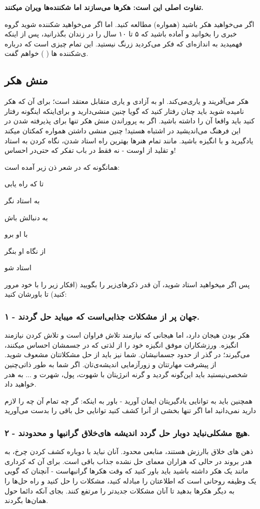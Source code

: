 \textbf{تفاوت اصلی این است: هکرها می‌سازند اما شکننده‌ها ویران میکنند.}

اگر می‌خواهید هکر باشید (همواره) مطالعه کنید. اما اگر می‌خواهید شکننده شوید گروه خبری‌
\href{news://alt.2600/}{}
را بخوانید و آماده باشید که ۵ تا ۱۰ سال را در زندان بگذرانید، پس از اینکه فهمیدید به اندازه‌ای که فکر می‌کردید زرنگ نیستید. این تمام چیزی است که درباره ی‌شکننده ها (
) خواهم گفت.
\subsection*{منش هکر}
هکر می‌آفریند و یاری‌می‌کند. او به آزادی و یاری متقابل معتقد است؛ برای آن که هکر نامیده شوید باید چنان رفتار کنید که گویا چنین منشی‌دارید و برای‌اینکه اینگونه رفتار کنید باید واقعا آن را داشته باشید. اگر به پروراندن منش هکر تنها برای پذیرفته شدن در این فرهنگ می‌اندیشید در اشتباه هستید! چنین منشی داشتن همواره کمکتان میکند یادگیرید و با انگیزه باشید. مانند تمام هنرها بهترین راه استاد شدن، نگاه کردن به استاد و تقلید از اوست - نه فقط در باب تفکر که حتی‌در احساس!

همانگونه که در شعر ذن زیر آمده است:
\begin{mybox}
تا که راه یابی

به استاد نگر

به دنبالش باش

با او برو

از نگاه او بنگر

استاد شو
\end{mybox}
پس اگر میخواهید استاد شوید، آن قدر ذکرهای‌زیر را بگویید (افکار زیر را با خود مرور کنید) تا باورشان کنید:
\subsubsection*{۱ - جهان پر از مشکلات جذابی‌است که میباید حل گردند.}
هکر بودن هیجان دارد، اما هیجانی که نیازمند تلاش فراوان است و تلاش کردن نیازمند انگیزه. ورزشکاران موفق انگیزه خود را از لذتی که در جسمشان احساس میکنند، می‌گیرند؛ در گذر از حدود جسمانیشان. شما نیز باید از حل مشکلاتتان مشعوف شوید. از پیشرفت مهارتتان و زورآزمایی اندیشه‌ی‌تان.
اگر شما به طور ذاتی‌چنین شخصی‌نیستید باید این‌گونه گردید و گرنه انرژیتان با شهوت، پول، شهرت و ... به هدر خواهید داد.

همچنین باید به توانایی یادگیریتان ایمان آورید - باور به اینکه: گر چه تمام آن چه را لازم دارید نمی‌دانید اما اگر تنها بخشی از آنرا کشف کنید توانایی حل باقی را بدست می‌آورید
\subsubsection*{۲ - هیچ مشکلی‌نباید دوبار حل گردد اندیشه های‌خلاق گرانبها و محدودند.}
ذهن های خلاق باارزش هستند، منابعی محدود. آنان نباید با دوباره کشف کردن چرخ، به هدر بروند در حالی که هزاران معمای حل نشده جذاب باقی است. برای آن که کرداری مانند یک هکر داشته باشید باید باور کنید که وقت هکرها گرانبهاست - آنچنان که گویی یک وظیفه روحانی است که اطلاعتان را مبادله کنید، مشکلات را حل کنید و راه حل‌ها را به دیگر هکرها بدهید تا آنان مشکلات جدیدتر را مرتفع کنند. بجای آنکه دائما حول همان‌ها بگردند.

